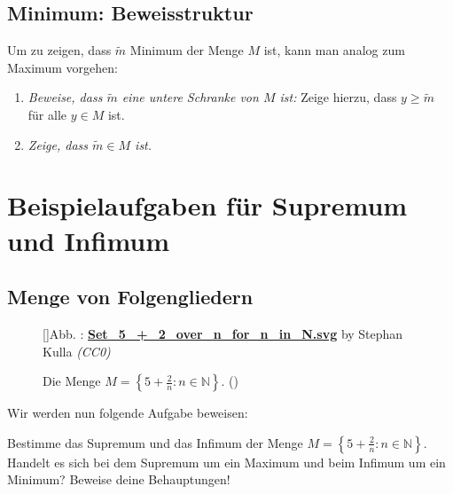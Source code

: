 \documentclass[fontsize=9pt,
               parskip=half-,
               DIV=14,
               listof=chapterentry,
               tocflat]{scrbook}
\newcounter{imagelabel}
\begin{document}
\subsection{Minimum: Beweisstruktur}

Um zu zeigen, dass ${\tilde {m}}$ Minimum der Menge $M$ ist, kann man analog zum Maximum vorgehen:

\begin{enumerate}
\item \emph{Beweise, dass ${\tilde {m}}$ eine untere Schranke von $M$ ist:} Zeige hierzu, dass $y\geq {\tilde {m}}$ für alle $y\in M$ ist.
\item \emph{Zeige, dass ${\tilde {m}}\in M$ ist.}
\end{enumerate}

\section{Beispielaufgaben für Supremum und Infimum}

\subsection{Menge von Folgengliedern}

\begin{figure}[h]
\vspace{\baselineskip}
[]{Abb. : \protect\href{https://commons.wikimedia.org/wiki/File:Set_5_+_2_over_n_for_n_in_N.svg}{\textbf{Set\allowbreak\_5\allowbreak\_+\allowbreak\_2\allowbreak\_over\allowbreak\_n\allowbreak\_for\allowbreak\_n\allowbreak\_in\allowbreak\_N.svg}} by Stephan Kulla \textit{(CC0)}}\centering
{}
\caption*{Die Menge $M=\left\{5+{\tfrac {2}{n}}:n\in \mathbb {N} \right\}$. ()}
\end{figure}
Wir werden nun folgende Aufgabe beweisen:

\begin{exercise*}
Bestimme das Supremum und das Infimum der Menge $M=\left\{5+{\tfrac {2}{n}}:n\in \mathbb {N} \right\}$. Handelt es sich bei dem Supremum um ein Maximum und beim Infimum um ein Minimum? Beweise deine Behauptungen!

\end{exercise*}
\end{document}

